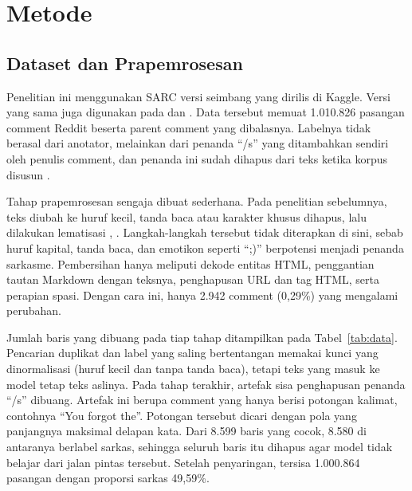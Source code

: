 \documentclass[conference]{IEEEtran}
\begin{document}
\section{Metode}

\subsection{Dataset dan Prapemrosesan}
\label{sec:data}
Penelitian ini menggunakan SARC \cite{khodak2018sarc} versi seimbang yang dirilis di Kaggle. Versi yang sama juga digunakan pada \cite{dubey2026efficient} dan \cite{zhang2025enhancing}. Data tersebut memuat 1.010.826 pasangan comment Reddit beserta parent comment yang dibalasnya. Labelnya tidak berasal dari anotator, melainkan dari penanda ``/s'' yang ditambahkan sendiri oleh penulis comment, dan penanda ini sudah dihapus dari teks ketika korpus disusun \cite{khodak2018sarc}.

Tahap prapemrosesan sengaja dibuat sederhana. Pada penelitian sebelumnya, teks diubah ke huruf kecil, tanda baca atau karakter khusus dihapus, lalu dilakukan lematisasi \cite{dubey2026efficient}, \cite{zhang2025enhancing}. Langkah-langkah tersebut tidak diterapkan di sini, sebab huruf kapital, tanda baca, dan emotikon seperti ``;)'' berpotensi menjadi penanda sarkasme. Pembersihan hanya meliputi dekode entitas HTML, penggantian tautan Markdown dengan teksnya, penghapusan URL dan tag HTML, serta perapian spasi. Dengan cara ini, hanya 2.942 comment (0,29\%) yang mengalami perubahan.

Jumlah baris yang dibuang pada tiap tahap ditampilkan pada Tabel~\ref{tab:data}. Pencarian duplikat dan label yang saling bertentangan memakai kunci yang dinormalisasi (huruf kecil dan tanpa tanda baca), tetapi teks yang masuk ke model tetap teks aslinya. Pada tahap terakhir, artefak sisa penghapusan penanda ``/s'' dibuang. Artefak ini berupa comment yang hanya berisi potongan kalimat, contohnya ``You forgot the''. Potongan tersebut dicari dengan pola yang panjangnya maksimal delapan kata. Dari 8.599 baris yang cocok, 8.580 di antaranya berlabel sarkas, sehingga seluruh baris itu dihapus agar model tidak belajar dari jalan pintas tersebut. Setelah penyaringan, tersisa 1.000.864 pasangan dengan proporsi sarkas 49,59\%.
\end{document}
